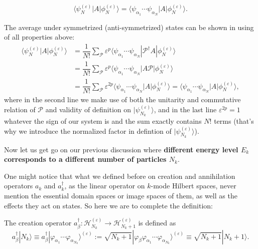\documentclass[b5paper,10pt,UTF8]{book}
\numberwithin{equation}{section}
\begin{document}
 		\begin{Lemma}
 			 \begin{equation}\label{1.4.9}
 			 	\langle\psi_N^{(\varepsilon)}|A|\phi_N^{(\varepsilon)}\rangle=\langle\psi_{\alpha_1}\cdots\psi_{\alpha_N}|A|\phi_N^{(\varepsilon)}\rangle.
 			 \end{equation}
 		\end{Lemma}
 		\begin{Proof}
 			The average under symmetrized (anti-symmetrized) states can be shown in using of all properties above:
 			\begin{align*}
 				\langle\psi_N^{(\varepsilon)}|A|\phi_N^{(\varepsilon)}\rangle&=\dfrac{1}{N!}\sum_{\mathcal{P}}\varepsilon^p\langle\psi_{\alpha_1}\cdots\psi_{\alpha_N}|\mathcal{P}^\dagger A|\phi_N^{(\varepsilon)}\rangle\\
 				&=\dfrac{1}{N!}\sum_{\mathcal{P}}\varepsilon^p\langle\psi_{\alpha_1}\cdots\psi_{\alpha_N}|A\mathcal{P}|\phi_N^{(\varepsilon)}\rangle\\
 				&=\dfrac{1}{N!}\sum_{\mathcal{P}}\varepsilon^{2p}\langle\psi_{\alpha_1}\cdots\psi_{\alpha_N}|A|\phi_N^{(\varepsilon)}\rangle=\langle\psi_{\alpha_1}\cdots\psi_{\alpha_N}|A|\phi_N^{(\varepsilon)}\rangle,
 			\end{align*}
 			where in the second line we make use of both the unitarity and commutative relation of $\mathcal{P}$ and validity of definition on $|\psi_{N_k}^{(\varepsilon)}\rangle$, and in the last line $\varepsilon^{2p}=1$ whatever the sign of our system is and the sum exactly contains $N!$ terms (that's why we introduce the normalized factor in defintion of $|\psi_{N_k}^{(\varepsilon)}\rangle$). 
 		\end{Proof}
 		Now let us get go on our previous discussion where \textbf{different energy level $E_k$ corresponds to a different number of particles $N_k$}.\par 
 		One might notice that what we defined before on creation and annihilation operators $a_k$ and $a_k^\dagger$, as the linear operator on $k$-mode Hilbert spaces, never mention the essential domain spaces or image spaces of them, as well as the effects they act on states. So here we are to complete the definition:
 		\begin{Def}
	 		The creation operator $a_\beta^\dagger:\mathcal{H}_{N_k}^{(\varepsilon)}\rightarrow\mathcal{H}_{N_k+1}^{(\varepsilon)}$ is defined as
 			\begin{equation}\label{1.4.3}
 				a^\dagger_\beta|N_k\rangle\equiv a^\dagger_\beta|\varphi_{\alpha_1}\cdots\varphi_{\alpha_{N_k}}\rangle^{(\varepsilon)}:=\sqrt{N_k+1}|\varphi_\beta\varphi_{\alpha_1}\cdots\varphi_{\alpha_{N_k}}\rangle^{(\varepsilon)}\equiv\sqrt{N_k+1}|N_k+1\rangle.
 			\end{equation}
 		\end{Def}
\end{document}
